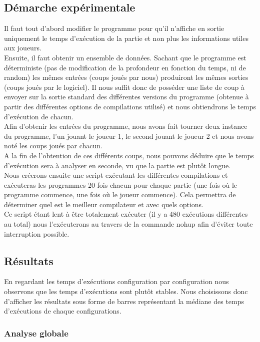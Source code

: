 \documentclass[
 aip,
 jmp,
 amsmath,amssymb,
 reprint
]{revtex4-1}
\begin{document}
\subsection{Démarche expérimentale}
Il faut tout d'abord modifier le programme pour qu'il n'affiche en sortie uniquement le temps d'exécution de la partie et non plus les informations utiles aux joueurs.\\
Ensuite, il faut obtenir un ensemble de données. Sachant que le programme est déterministe (pas de modification de la profondeur en fonction du temps, ni de random) les mêmes entrées (coups joués par nous) produiront les mêmes sorties (coups joués par le logiciel). Il nous suffit donc de posséder une liste de coup à envoyer sur la sortie standard des différentes versions du programme (obtenue à partir des différentes options de compilations utilisé) et nous obtiendrons le temps d'exécution de chacun.\\
Afin d'obtenir les entrées du programme, nous avons fait tourner deux instance du programme, l'un jouant le joueur 1, le second jouant le joueur 2 et nous avons noté les coups joués par chacun.\\
A la fin de l'obtention de ces différents coups, nous pouvons déduire que le temps d'exécution sera à analyser en seconde, vu que la partie est plutôt longue.\\
Nous créerons ensuite une script exécutant les différentes compilations et exécuteras les programmes 20 fois chacun pour chaque partie (une fois où le programme commence, une fois où le joueur commence). Cela permettra de déterminer quel est le meilleur compilateur et avec quels options.\\
Ce script étant lent à être totalement exécuter (il y a 480 exécutions différentes au total) nous l'exécuterons au travers de la commande nohup afin d'éviter toute interruption possible.\\

\subsection{Résultats}
En regardant les temps d'exécutions configuration par configuration nous observons que les temps d'exécutions sont plutôt stables. Nous choisissons donc d'afficher les résultats sous forme de barres représentant la médiane des temps d'exécutions de chaque configurations.\\
\subsubsection{Analyse globale}
\end{document}
